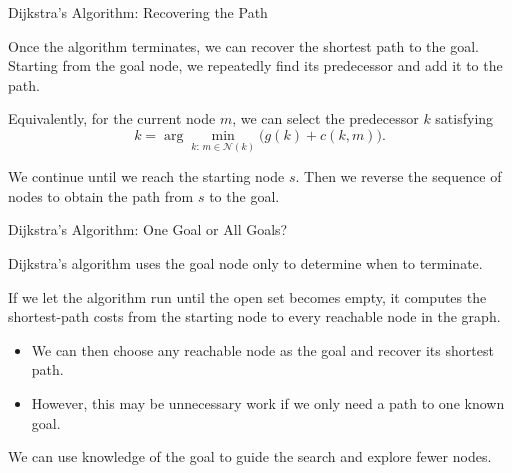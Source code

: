 \documentclass{beamer}
\begin{document}
\begin{frame}{Dijkstra's Algorithm: Recovering the Path}
	\begin{flushleft}
		
		Once the algorithm terminates, we can recover
		the shortest path to the goal. Starting from the goal node, we repeatedly find
		its predecessor and add it to the path.
		
		\medskip
		
		Equivalently, for the current node $m$, we can
		select the predecessor $k$ satisfying
		\[
		k=\arg\min_{k:\,m\in\mathcal{N}(k)}
		\bigl(g(k)+c(k,m)\bigr).
		\]
		
		We continue until we reach the starting node $s$.
		Then we reverse the sequence of nodes to obtain
		the path from $s$ to the goal.
		
	\end{flushleft}
\end{frame}

\begin{frame}{Dijkstra's Algorithm: One Goal or All Goals?}
	\begin{flushleft}
		
		Dijkstra's algorithm uses the goal node only
		to determine when to terminate.
		
		
		\medskip
		
		If we let the algorithm run until the open set
		becomes empty, it computes the shortest-path
		costs from the starting node to every reachable
		node in the graph.
		
		\begin{itemize}
			\item We can then choose any reachable node
			as the goal and recover its shortest path.
			\item However, this may be unnecessary work
			if we only need a path to one known goal.
		\end{itemize}
		
		We can use knowledge of the goal to guide the
		search and explore fewer nodes.
		
	\end{flushleft}
\end{frame}
\end{document}
